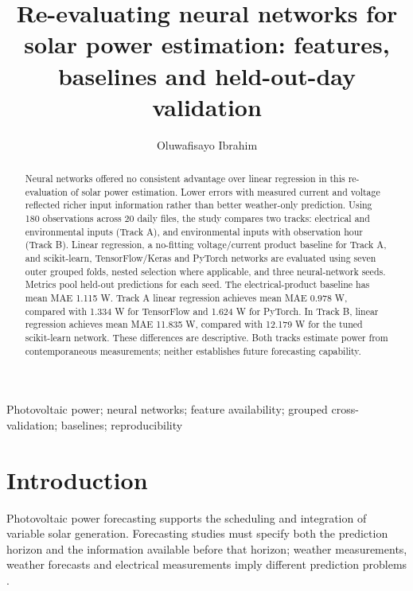 \documentclass[10pt,journal,twoside]{IEEEtran}
\begin{document}
\raggedbottom


\title{Re-evaluating neural networks for solar power estimation: features, baselines and held-out-day validation}

\author{Oluwafisayo Ibrahim}

\maketitle

\begin{abstract}Neural networks offered no consistent advantage over linear regression in this re-evaluation of solar power estimation. Lower errors with measured current and voltage reflected richer input information rather than better weather-only prediction. Using 180 observations across 20 daily files, the study compares two tracks: electrical and environmental inputs (Track A), and environmental inputs with observation hour (Track B). Linear regression, a no-fitting voltage/current product baseline for Track A, and scikit-learn, TensorFlow/Keras and PyTorch networks are evaluated using seven outer grouped folds, nested selection where applicable, and three neural-network seeds. Metrics pool held-out predictions for each seed. The electrical-product baseline has mean MAE 1.115 W. Track A linear regression achieves mean MAE 0.978 W, compared with 1.334 W for TensorFlow and 1.624 W for PyTorch. In Track B, linear regression achieves mean MAE 11.835 W, compared with 12.179 W for the tuned scikit-learn network. These differences are descriptive. Both tracks estimate power from contemporaneous measurements; neither establishes future forecasting capability.\end{abstract}

\begin{IEEEkeywords}Photovoltaic power; neural networks; feature availability; grouped cross-validation; baselines; reproducibility\end{IEEEkeywords}

\section{Introduction}


Photovoltaic power forecasting supports the scheduling and integration of variable solar generation.
Forecasting studies must specify both the prediction horizon and the information available before
that horizon; weather measurements, weather forecasts and electrical measurements imply different
prediction problems \cite{ref2}.
\end{document}
